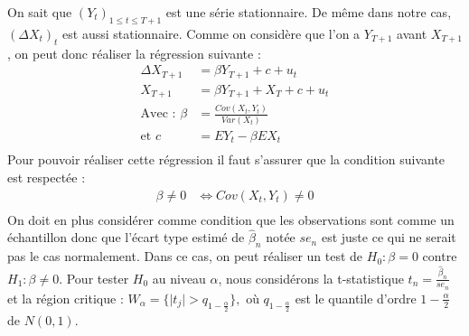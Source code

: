 \documentclass[
  landscape]{article}
\begin{document}
On sait que \((Y_{t})_{1 \leq t \leq T+1}\) est une série stationnaire.
De même dans notre cas, \((\Delta X_{t})_{t}\) est aussi stationnaire.
Comme on considère que l'on a \(Y_{T+1}\) avant \(X_{T+1}\), on peut
donc réaliser la régression suivante : \begin{align*}
\Delta X_{T+1} &= \beta Y_{T+1} + c + u_{t} \\
X_{T+1} &= \beta Y_{T+1} + X_{T} + c + u_{t} \\
\text{Avec : }\beta &= \frac{Cov(X_{t},Y_{t})}{Var(X_{t})} \\
\text{et }c &= EY_{t}-\beta EX_{t} \\
\end{align*} Pour pouvoir réaliser cette régression il faut s'assurer
que la condition suivante est respectée : \begin{align*}
\beta \neq 0 &\iff Cov(X_{t},Y_{t}) \neq 0 \\
\end{align*} On doit en plus considérer comme condition que les
observations sont comme un échantillon donc que l'écart type estimé de
\(\hat{\beta}_{n}\) notée \(se_{n}\) est juste ce qui ne serait pas le
cas normalement. Dans ce cas, on peut réaliser un test de
\(H_{0} : \beta = 0\) contre \(H_{1} : \beta \neq 0\). Pour tester
\(H_{0}\) au niveau \(\alpha\), nous considérons la t-statistique
\(t_{n}=\frac{\hat{\beta}_{n}}{se_{n}}\) et la région critique :
\(W_{\alpha}=\{\mid t_{j} \mid > q_{1-\frac{\alpha}{2}}\},\) où
\(q_{1-\frac{\alpha}{2}}\) est le quantile d'ordre
\(1-\frac{\alpha}{2}\) de \(N(0,1)\).
\end{document}
